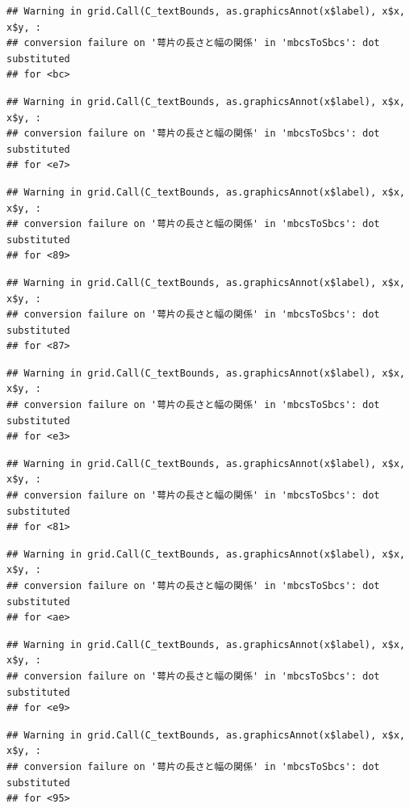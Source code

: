 \documentclass[
]{book}
\begin{document}
\begin{verbatim}
## Warning in grid.Call(C_textBounds, as.graphicsAnnot(x$label), x$x, x$y, :
## conversion failure on '萼片の長さと幅の関係' in 'mbcsToSbcs': dot substituted
## for <bc>
\end{verbatim}

\begin{verbatim}
## Warning in grid.Call(C_textBounds, as.graphicsAnnot(x$label), x$x, x$y, :
## conversion failure on '萼片の長さと幅の関係' in 'mbcsToSbcs': dot substituted
## for <e7>
\end{verbatim}

\begin{verbatim}
## Warning in grid.Call(C_textBounds, as.graphicsAnnot(x$label), x$x, x$y, :
## conversion failure on '萼片の長さと幅の関係' in 'mbcsToSbcs': dot substituted
## for <89>
\end{verbatim}

\begin{verbatim}
## Warning in grid.Call(C_textBounds, as.graphicsAnnot(x$label), x$x, x$y, :
## conversion failure on '萼片の長さと幅の関係' in 'mbcsToSbcs': dot substituted
## for <87>
\end{verbatim}

\begin{verbatim}
## Warning in grid.Call(C_textBounds, as.graphicsAnnot(x$label), x$x, x$y, :
## conversion failure on '萼片の長さと幅の関係' in 'mbcsToSbcs': dot substituted
## for <e3>
\end{verbatim}

\begin{verbatim}
## Warning in grid.Call(C_textBounds, as.graphicsAnnot(x$label), x$x, x$y, :
## conversion failure on '萼片の長さと幅の関係' in 'mbcsToSbcs': dot substituted
## for <81>
\end{verbatim}

\begin{verbatim}
## Warning in grid.Call(C_textBounds, as.graphicsAnnot(x$label), x$x, x$y, :
## conversion failure on '萼片の長さと幅の関係' in 'mbcsToSbcs': dot substituted
## for <ae>
\end{verbatim}

\begin{verbatim}
## Warning in grid.Call(C_textBounds, as.graphicsAnnot(x$label), x$x, x$y, :
## conversion failure on '萼片の長さと幅の関係' in 'mbcsToSbcs': dot substituted
## for <e9>
\end{verbatim}

\begin{verbatim}
## Warning in grid.Call(C_textBounds, as.graphicsAnnot(x$label), x$x, x$y, :
## conversion failure on '萼片の長さと幅の関係' in 'mbcsToSbcs': dot substituted
## for <95>
\end{verbatim}
\end{document}
